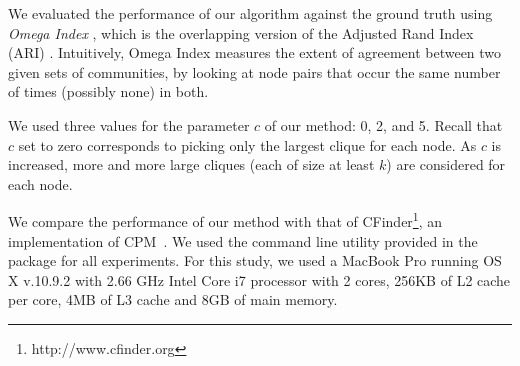 %
%
%
%
%
%

We evaluated the performance of our algorithm against the ground truth 
using {\it Omega Index} \cite{doi:10.1207/s15327906mbr2302_6}, 
which is the overlapping version of the Adjusted Rand Index (ARI) \cite{ARI_paper_1985}.
Intuitively, Omega Index measures the extent of agreement between two given sets of communities, by looking at node pairs that occur the same number of times (possibly none) in both.

We used three values for the parameter $c$ of our method: 0, 2, and 5. 
Recall that $c$ set to zero corresponds to picking only the largest clique for each node. 
As $c$ is increased, more and more large cliques (each of size at least $k$)
are considered for each node. 

We compare the performance of our method with that of CFinder\footnote{http://www.cfinder.org}, an implementation of CPM~\cite{cite-key}. We used the command line utility provided in the package for all experiments. For this study, we used a MacBook Pro running OS X v.10.9.2 with 2.66 GHz Intel Core i7 processor with 2 cores, 256KB of L2 cache per core, 4MB of L3 cache and 8GB of main memory.

